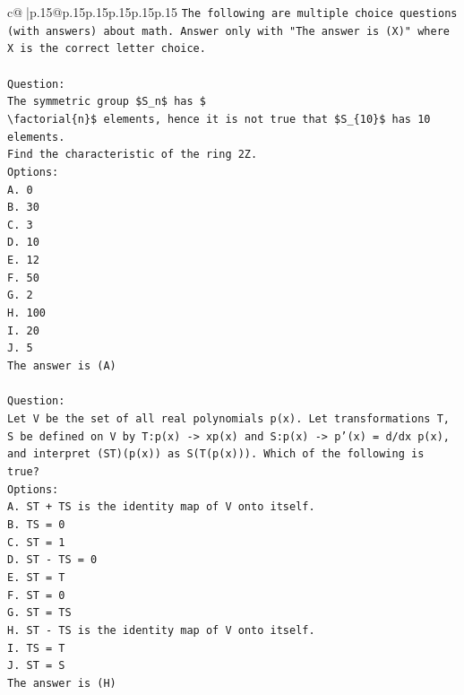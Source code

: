 \documentclass{article}
\begin{document}
{\begin{supertabular}{c@{$\;$}|p{.15\linewidth}@{}p{.15\linewidth}p{.15\linewidth}p{.15\linewidth}p{.15\linewidth}p{.15\linewidth}}
{{{\texttt{The following are multiple choice questions (with answers) about math. Answer only with "The answer is (X)" where X is the correct letter choice.} \\
\\ 
\texttt{Question:} \\
\texttt{The symmetric group \$S\_n\$ has \$} \\
\texttt{\textbackslash{}factorial\{n\}\$ elements, hence it is not true that \$S\_\{10\}\$ has 10 elements.} \\
\texttt{Find the characteristic of the ring 2Z.} \\
\texttt{Options:} \\
\texttt{A. 0} \\
\texttt{B. 30} \\
\texttt{C. 3} \\
\texttt{D. 10} \\
\texttt{E. 12} \\
\texttt{F. 50} \\
\texttt{G. 2} \\
\texttt{H. 100} \\
\texttt{I. 20} \\
\texttt{J. 5} \\
\texttt{The answer is (A)} \\
\\ 
\texttt{Question:} \\
\texttt{Let V be the set of all real polynomials p(x). Let transformations T, S be defined on V by T:p(x) {-}> xp(x) and S:p(x) {-}> p'(x) = d/dx p(x), and interpret (ST)(p(x)) as S(T(p(x))). Which of the following is true?} \\
\texttt{Options:} \\
\texttt{A. ST + TS is the identity map of V onto itself.} \\
\texttt{B. TS = 0} \\
\texttt{C. ST = 1} \\
\texttt{D. ST {-} TS = 0} \\
\texttt{E. ST = T} \\
\texttt{F. ST = 0} \\
\texttt{G. ST = TS} \\
\texttt{H. ST {-} TS is the identity map of V onto itself.} \\
\texttt{I. TS = T} \\
\texttt{J. ST = S} \\
\texttt{The answer is (H)} \\
\\ 
}}}
\end{supertabular}}
\end{document}
